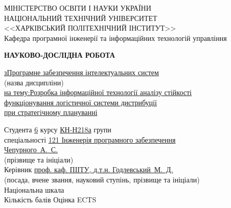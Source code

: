 {
\newcommand{\fillemptyline}{\uline{\hspace*{\fill}}}
\newcommand{\fillline}[2][]{\uline{#1\hspace*{\fill}#2\hspace*{\fill}\hphantom{#1}}}

\newcommand{\suline}[1]{\uline{\hspace{12pt}#1\hspace{12pt}}}
\newcommand{\undercaption}[1]{{\centering\footnotesize#1\\\noindent}}

\begin{titlepage}
	\begin{center}
		МІНІСТЕРСТВО ОСВІТИ І НАУКИ УКРАЇНИ \\
		НАЦІОНАЛЬНИЙ ТЕХНІЧНИЙ УНІВЕРСИТЕТ \\
		<<ХАРКІВСЬКИЙ ПОЛІТЕХНІЧНИЙ ІНСТИТУТ>> \\
		Кафедра програмної інженерії та інформаційних технологій управління
	\end{center}
	\vspace*{\fill}
	\begin{center}
		\MakeUppercase{\large\bfseries Науково-дослідна робота}
	\end{center}
	\noindent
	\fillline[з]{Програмне забезпечення інтелектуальних систем} \\
	\undercaption{(назва дисципліни)}
	\fillline[на тему:]{Розробка інформаційної технології аналізу стійкості} \\
	\fillline{функціонування логістичної системи дистрибуції} \\
	\fillline{при стратегічному плануванні}
	
	\vspace*{\fill}

	\begin{addmargin}[7cm]{0cm}
		\small
		Студента \suline{6} курсу \suline{КН-Н218а} групи \hspace*{\fill} \\
		спеціальності \fillline{121 Інженерія програмного забезпечення} \\ 
		\fillline{Чепурного~А.~С.} \\
		\undercaption{(прізвище та ініціали)}
		Керівник \fillline{проф. каф. ПІІТУ, д.т.н. Годлевський~М.~Д.} \\
		\undercaption{(посада, вчене звання, науковий ступінь, прізвище та ініціали)}
		Національна шкала \fillemptyline \\
		Кількість балів	\fillemptyline Оцінка ECTS \fillemptyline	
	\end{addmargin}


\end{titlepage}}
